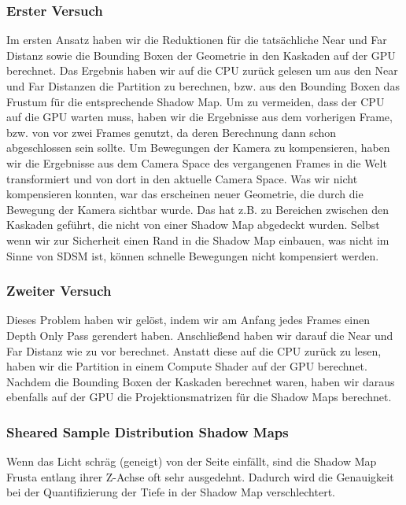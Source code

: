 \documentclass[runningheaders,a4paper]{llncs}
\begin{document}
\subsubsection{Erster Versuch}
Im ersten Ansatz haben wir die Reduktionen für die tatsächliche Near und Far Distanz sowie die Bounding Boxen der Geometrie in den Kaskaden auf der GPU berechnet.
Das Ergebnis haben wir auf die CPU zurück gelesen um aus den Near und Far Distanzen die Partition zu berechnen, bzw. aus den Bounding Boxen das Frustum für die entsprechende Shadow Map.
Um zu vermeiden, dass der CPU auf die GPU warten muss, haben wir die Ergebnisse aus dem vorherigen Frame, bzw. von vor zwei Frames genutzt, da deren Berechnung dann schon abgeschlossen sein sollte.
Um Bewegungen der Kamera zu kompensieren, haben wir die Ergebnisse aus dem Camera Space des vergangenen Frames in die Welt transformiert und von dort in den aktuelle Camera Space.
Was wir nicht kompensieren konnten, war das erscheinen neuer Geometrie, die durch die Bewegung der Kamera sichtbar wurde.
Das hat z.B. zu Bereichen zwischen den Kaskaden geführt, die nicht von einer Shadow Map abgedeckt wurden.
Selbst wenn wir zur Sicherheit einen Rand in die Shadow Map einbauen, was nicht im Sinne von SDSM ist, können schnelle Bewegungen nicht kompensiert werden.

\subsubsection{Zweiter Versuch}
Dieses Problem haben wir gelöst, indem wir am Anfang jedes Frames einen Depth Only Pass gerendert haben.
Anschließend haben wir darauf die Near und Far Distanz wie zu vor berechnet.
Anstatt diese auf die CPU zurück zu lesen, haben wir die Partition in einem Compute Shader auf der GPU berechnet.
Nachdem die Bounding Boxen der Kaskaden berechnet waren, haben wir daraus ebenfalls auf der GPU die Projektionsmatrizen für die Shadow Maps berechnet.


\subsubsection{Sheared Sample Distribution Shadow Maps}
Wenn das Licht schräg (geneigt) von der Seite einfällt, sind die Shadow Map Frusta entlang ihrer Z-Achse oft sehr ausgedehnt.
Dadurch wird die Genauigkeit bei der Quantifizierung der Tiefe in der Shadow Map verschlechtert.
\end{document}
